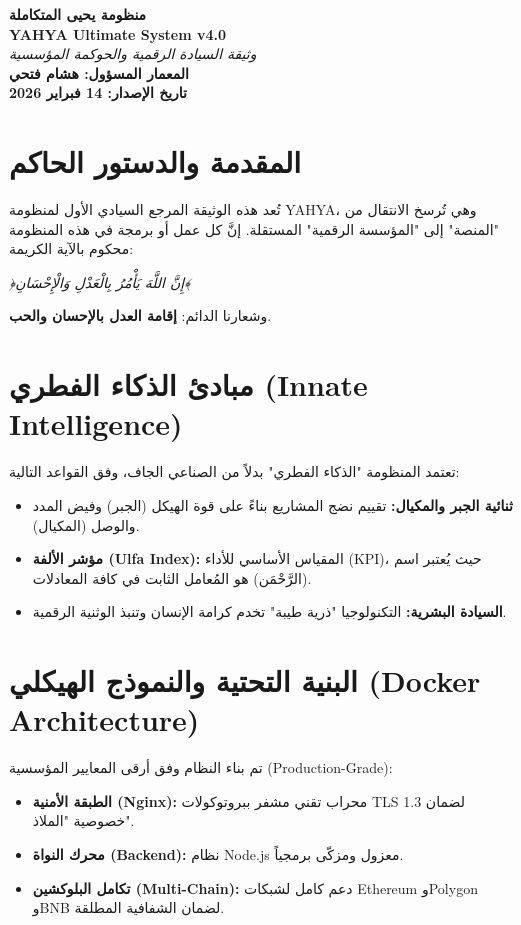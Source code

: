 \documentclass[11pt, a4paper]{article}
\begin{document}
\begin{center}
    {\color{yahyablue} \Huge \textbf{منظومة يحيى المتكاملة}} \\
    \vspace{0.3cm}
    {\large \textbf{YAHYA Ultimate System v4.0}} \\
    \vspace{0.5cm}
    {\small \textit{وثيقة السيادة الرقمية والحوكمة المؤسسية}} \\
    \vspace{1cm}
    \textbf{المعمار المسؤول: هشام فتحي} \\
    \textbf{تاريخ الإصدار: 14 فبراير 2026}
\end{center}

\vspace{1cm}

\section{المقدمة والدستور الحاكم}
تُعد هذه الوثيقة المرجع السيادي الأول لمنظومة YAHYA، وهي تُرسخ الانتقال من "المنصة" إلى "المؤسسة الرقمية" المستقلة. إنَّ كل عمل أو برمجة في هذه المنظومة محكوم بالآية الكريمة: 
\begin{center}
    \textit{﴿إِنَّ اللَّهَ يَأْمُرُ بِالْعَدْلِ وَالْإِحْسَانِ﴾}
\end{center}
وشعارنا الدائم: \textbf{إقامة العدل بالإحسان والحب}.

\section{مبادئ الذكاء الفطري (Innate Intelligence)}
تعتمد المنظومة "الذكاء الفطري" بدلاً من الصناعي الجاف، وفق القواعد التالية:
\begin{itemize}
    \item \textbf{ثنائية الجبر والمكيال:} تقييم نضج المشاريع بناءً على قوة الهيكل (الجبر) وفيض المدد والوصل (المكيال).
    \item \textbf{مؤشر الألفة (Ulfa Index):} المقياس الأساسي للأداء (KPI)، حيث يُعتبر اسم (الرَّحْمَن) هو المُعامل الثابت في كافة المعادلات.
    \item \textbf{السيادة البشرية:} التكنولوجيا "ذرية طيبة" تخدم كرامة الإنسان وتنبذ الوثنية الرقمية.
\end{itemize}

\section{البنية التحتية والنموذج الهيكلي (Docker Architecture)}
تم بناء النظام وفق أرقى المعايير المؤسسية (Production-Grade):
\begin{itemize}
    \item \textbf{الطبقة الأمنية (Nginx):} محراب تقني مشفر ببروتوكولات TLS 1.3 لضمان خصوصية "الملاذ".
    \item \textbf{محرك النواة (Backend):} نظام Node.js معزول ومزكّى برمجياً.
    \item \textbf{تكامل البلوكشين (Multi-Chain):} دعم كامل لشبكات Ethereum وPolygon وBNB لضمان الشفافية المطلقة.
\end{itemize}
\end{document}
